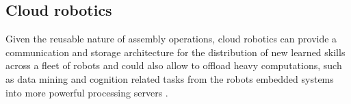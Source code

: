 %


\subsection{Cloud robotics}

Given the reusable nature of assembly operations, cloud robotics can provide a communication and storage architecture for the distribution of new learned skills across a fleet of robots \cite{Tenorth2013} and could also allow to offload heavy computations, such as data mining \cite{Witten2005} and cognition related tasks \cite{Beetz2010,Tenorth2013k,Saxena2014,Beetz2015} from the robots embedded systems into more powerful processing servers \cite{Hunziker2013}.




